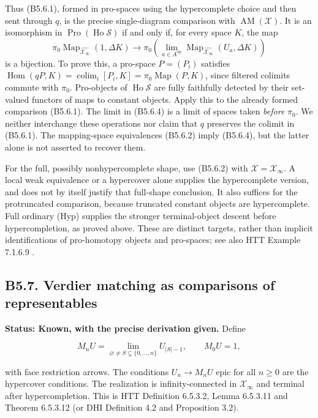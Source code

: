 Thus (B5.6.1), formed in pro-spaces using the hypercomplete choice and
then sent through \(q\), is the precise single-diagram comparison with
\(\operatorname{AM}(\mathcal X)\). It is an isomorphism in
\(\operatorname{Pro}(\operatorname{Ho}\mathcal S)\) if and only if, for
every space \(K\), the map
\[
\pi_0\operatorname{Map}_{\widehat{\mathcal X_\infty}}(1,\Delta K)
\longrightarrow
\pi_0\!\left(\lim_{a\in A^{\mathrm{op}}}
\operatorname{Map}_{\widehat{\mathcal X_\infty}}(U_a,\Delta K)\right)
\tag{B5.6.4}
\]
is a bijection. To prove this, a pro-space \(P=(P_i)\) satisfies
\(\operatorname{Hom}(qP,K)=\operatorname{colim}_i[P_i,K]
=\pi_0\operatorname{Map}(P,K)\), since filtered colimits commute with
\(\pi_0\). Pro-objects of \(\operatorname{Ho}\mathcal S\) are fully
faithfully detected by their set-valued functors of maps to constant
objects. Apply this to the already formed comparison (B5.6.1).
The limit in (B5.6.4) is a limit of spaces taken \emph{before} \(\pi_0\).
We neither interchange these operations nor claim that \(q\) preserves
the colimit in (B5.6.1). The mapping-space equivalences (B5.6.2) imply
(B5.6.4), but the latter alone is not asserted to recover them.

For the full, possibly nonhypercomplete shape, use (B5.6.2) with
\(\mathscr X=\mathcal X_\infty\). A local weak equivalence or a
hypercover alone supplies the hypercomplete version, and does not by
itself justify that full-shape conclusion. It also suffices for the
protruncated comparison, because truncated constant objects are
hypercomplete. Full ordinary (Hyp) supplies the stronger terminal-object
descent before hypercompletion, as proved above. These are distinct
targets, rather than implicit identifications of pro-homotopy objects
and pro-spaces; see also HTT Example 7.1.6.9 \cite{B56HTT}.

\subsection{B5.7. Verdier matching as comparisons of
representables}\label{b5.7.-verdier-matching-as-comparisons-of-representables}

\textbf{Status: Known, with the precise derivation given.} Define

\[M_nU=\lim_{\varnothing\ne S\subsetneq\{0,\ldots,n\}}U_{|S|-1},\qquad M_0U=1,\]

with face restriction arrows. The conditions \(U_n\to M_nU\) epic for
all \(n\ge0\) are the hypercover conditions. The realization is
infinity-connected in \(\mathcal X_\infty\) and terminal after
hypercompletion. This is HTT Definition 6.5.3.2, Lemma 6.5.3.11 and
Theorem 6.5.3.12 \cite{B56HTT} (or DHI Definition 4.2 and Proposition
3.2).

